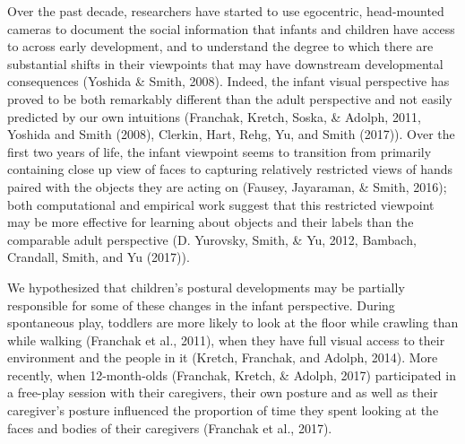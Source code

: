 \documentclass[english,man,floatsintext]{apa6}
\begin{document}
Over the past decade, researchers have started to use egocentric,
head-mounted cameras to document the social information that infants and
children have access to across early development, and to understand the
degree to which there are substantial shifts in their viewpoints that
may have downstream developmental consequences (Yoshida \& Smith, 2008).
Indeed, the infant visual perspective has proved to be both remarkably
different than the adult perspective and not easily predicted by our own
intuitions (Franchak, Kretch, Soska, \& Adolph, 2011, Yoshida and Smith
(2008), Clerkin, Hart, Rehg, Yu, and Smith (2017)). Over the first two
years of life, the infant viewpoint seems to transition from primarily
containing close up view of faces to capturing relatively restricted
views of hands paired with the objects they are acting on (Fausey,
Jayaraman, \& Smith, 2016); both computational and empirical work
suggest that this restricted viewpoint may be more effective for
learning about objects and their labels than the comparable adult
perspective (D. Yurovsky, Smith, \& Yu, 2012, Bambach, Crandall, Smith,
and Yu (2017)).

We hypothesized that children's postural developments may be partially
responsible for some of these changes in the infant perspective. During
spontaneous play, toddlers are more likely to look at the floor while
crawling than while walking (Franchak et al., 2011), when they have full
visual access to their environment and the people in it (Kretch,
Franchak, and Adolph, 2014). More recently, when 12-month-olds
(Franchak, Kretch, \& Adolph, 2017) participated in a free-play session
with their caregivers, their own posture and as well as their
caregiver's posture influenced the proportion of time they spent looking
at the faces and bodies of their caregivers (Franchak et al., 2017).
\end{document}
